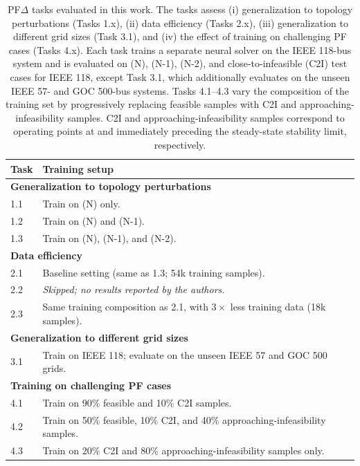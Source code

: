 \begin{table}
\centering
\small
\renewcommand{\arraystretch}{1.0}
\begin{tabularx}{\linewidth}{lX}
\toprule
\textbf{Task} & \textbf{Training setup} \\
\midrule
\multicolumn{2}{l}{\textbf{Generalization to topology perturbations}} \\
\midrule
1.1 & Train on (N) only. \\
1.2 & Train on (N) and (N{-}1). \\
1.3 & Train on (N), (N{-}1), and (N{-}2). \\
\midrule
\multicolumn{2}{l}{\textbf{Data efficiency}} \\
\midrule
2.1 & Baseline setting (same as 1.3; 54k training samples). \\
2.2 & \textit{Skipped; no results reported by the authors.} \\
2.3 & Same training composition as 2.1, with $3\times$ less training data (18k samples). \\
\midrule
\multicolumn{2}{l}{\textbf{Generalization to different grid sizes}} \\
\midrule
3.1 & Train on IEEE 118; evaluate on the unseen IEEE 57 and GOC 500 grids. \\
\midrule
\multicolumn{2}{l}{\textbf{Training on challenging PF cases}} \\
\midrule
4.1 & Train on 90\% feasible and 10\% C2I samples. \\
4.2 & Train on 50\% feasible, 10\% C2I, and 40\% approaching-infeasibility samples. \\
4.3 & Train on 20\% C2I and 80\% approaching-infeasibility samples only. \\
\bottomrule
\end{tabularx}
\caption{PF$\Delta$ tasks evaluated in this work. The tasks assess (i) generalization to topology perturbations (Tasks 1.x), (ii) data efficiency (Tasks 2.x), (iii) generalization to different grid sizes (Task 3.1), and (iv) the effect of training on challenging PF cases (Tasks 4.x). Each task trains a separate neural solver on the IEEE 118-bus system and is evaluated on (N), (N{-}1), (N{-}2), and close-to-infeasible (C2I) test cases for IEEE 118, except Task 3.1, which additionally evaluates on the unseen IEEE 57- and GOC 500-bus systems. Tasks 4.1--4.3 vary the composition of the training set by progressively replacing feasible samples with C2I and approaching-infeasibility samples. C2I and approaching-infeasibility samples correspond to operating points at and immediately preceding the steady-state stability limit, respectively.}
\label{tab:tasks-summary}
\end{table}





